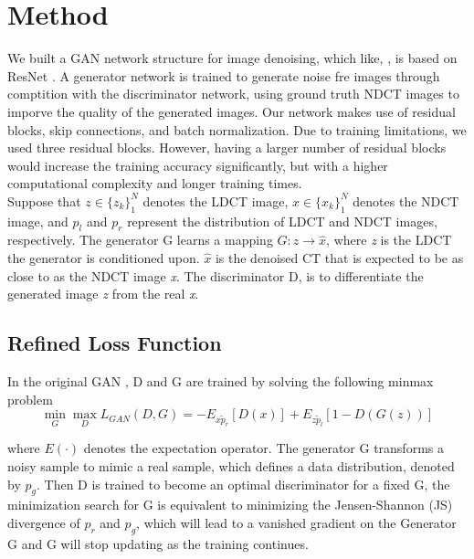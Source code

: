 \documentclass[journal]{IEEEtran}
\begin{document}
\section{Method}
\label{method}
	We built a GAN network structure for image denoising, which like, \cite{alsaiari2019image}, is based on ResNet \cite{he2016deep}.  A generator network is trained to generate noise fre images through comptition with the discriminator network, using ground truth NDCT images to imporve the quality of the generated images.  Our network makes use of residual blocks, skip connections, and batch normalization.  Due to training limitations, we used three residual blocks.  However, having a larger number of residual blocks would increase the training accuracy significantly, but with a higher computational complexity and longer training times.\\
	Suppose that $z \in \{z_k\}_1^N$ denotes the LDCT image, $x \in \{x_k\}_1^N$ denotes the NDCT image, and $p_l$ and $p_r$ represent the distribution of LDCT and NDCT images, respectively.  The generator G learns a mapping $G: z \rightarrow \hat{x}$, where \emph{z} is the LDCT the generator is conditioned upon.  $\hat{x}$ is the denoised CT that is expected to be as close to as the NDCT image \emph{x}.  The discriminator D, is to differentiate the generated image \emph{z} from the real \emph{x}.  
	
\subsection{Refined Loss Function}
\label{loss function}
In the original GAN \cite{goodfellow2014generative}, D and G are trained by solving the following minmax problem\\

\begin{equation}
	\mathop{min}_{G}\mathop{max}_{D} L_{GAN}(D,G) = -E_{x \tilde p_r}[D(x)] + E_{z \tilde p_l}[1-D(G(z))]
\end{equation}

where $E(\cdot)$ denotes the expectation operator.  The generator G transforms a noisy sample to mimic a real sample, which defines a data distribution, denoted by $p_g$.  Then D is trained to become an optimal discriminator for a fixed G, the minimization search for G is equivalent to minimizing the Jensen-Shannon (JS) divergence of $p_r$ and $p_g$, which will lead to a vanished gradient on the Generator G  \cite{8340157} and G will stop updating as the training continues.
\end{document}
